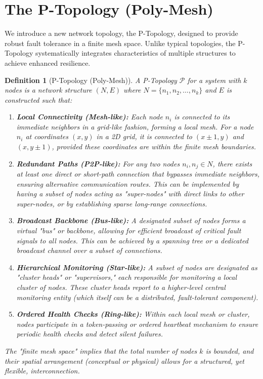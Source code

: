 \documentclass[10pt]{article}
\newtheorem{definition}[theorem]{Definition
}
\begin{document}
\section{The P-Topology (Poly-Mesh)}
We introduce a new network topology, the P-Topology, designed to provide robust fault tolerance in a finite mesh space. Unlike typical topologies, the P-Topology systematically integrates characteristics of multiple structures to achieve enhanced resilience.

\begin{definition}[P-Topology (Poly-Mesh)]
A P-Topology $\mathcal{P}$ for a system with $k$ nodes is a network structure $(N, E)$ where $N=\{n_1, n_2, \dots, n_k\}$ and $E$ is constructed such that:
\begin{enumerate}
    \item \textbf{Local Connectivity (Mesh-like):} Each node $n_i$ is connected to its immediate neighbors in a grid-like fashion, forming a local mesh. For a node $n_i$ at coordinates $(x,y)$ in a 2D grid, it is connected to $(x \pm 1, y)$ and $(x, y \pm 1)$, provided these coordinates are within the finite mesh boundaries.
    \item \textbf{Redundant Paths (P2P-like):} For any two nodes $n_i, n_j \in N$, there exists at least one direct or short-path connection that bypasses immediate neighbors, ensuring alternative communication routes. This can be implemented by having a subset of nodes acting as "super-nodes" with direct links to other super-nodes, or by establishing sparse long-range connections.
    \item \textbf{Broadcast Backbone (Bus-like):} A designated subset of nodes forms a virtual "bus" or backbone, allowing for efficient broadcast of critical fault signals to all nodes. This can be achieved by a spanning tree or a dedicated broadcast channel over a subset of connections.
    \item \textbf{Hierarchical Monitoring (Star-like):} A subset of nodes are designated as "cluster heads" or "supervisors," each responsible for monitoring a local cluster of nodes. These cluster heads report to a higher-level central monitoring entity (which itself can be a distributed, fault-tolerant component).
    \item \textbf{Ordered Health Checks (Ring-like):} Within each local mesh or cluster, nodes participate in a token-passing or ordered heartbeat mechanism to ensure periodic health checks and detect silent failures.
\end{enumerate}
The "finite mesh space" implies that the total number of nodes $k$ is bounded, and their spatial arrangement (conceptual or physical) allows for a structured, yet flexible, interconnection.
\end{definition}
\end{document}
